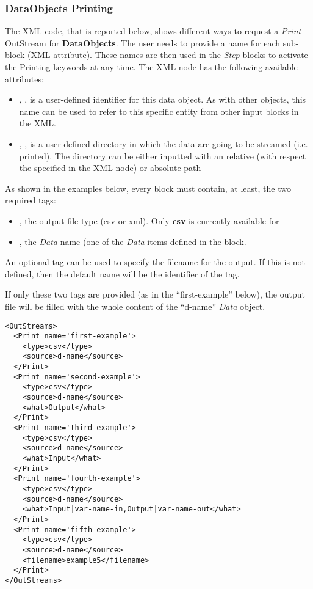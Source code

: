 \subsubsection{\textbf{DataObjects} Printing}
The XML code, that is reported below, shows different ways to request a
\textit{Print} OutStream for \textbf{DataObjects}.
%
The user needs to provide a name for each sub-block (XML attribute).
%
These names are then used in the \textit{Step} blocks to activate the Printing
keywords at any time.
%
The XML node has the following
available attributes:
\begin{itemize}
  \itemsep0em
  \item {}, , is a user-defined
  identifier for this data object.
  \nb As with other objects, this name can be used to refer to this specific
  entity from other input blocks in the XML.
  \item {}, , is a user-defined
  directory in which the data are going to be streamed (i.e. printed). The
  directory can be either inputted with an relative (with respect the  specified
  in the    XML node)  or absolute path
 \end{itemize}
As shown in the examples below, every  block must contain, at
least, the two required tags:
\vspace{-5mm}
\begin{itemize}
  \itemsep0em
  \item {}, the output file type (csv or xml).
  \nb Only \textbf{csv} is currently available for 
  \item {}, the \textit{Data} name (one of the \textit{Data} items
  defined in the  block.
\end{itemize}
\vspace{-5mm}

An optional tag  can be used to specify the filename for the
output. If this is not defined, then the default name will be the 
identifier of the tag.

If only these two tags are provided (as in the ``first-example'' below), the
output file will be filled with the whole content of the ``d-name''
\textit{Data} object.
%
\begin{lstlisting}[style=XML]
<OutStreams>
  <Print name='first-example'>
    <type>csv</type>
    <source>d-name</source>
  </Print>
  <Print name='second-example'>
    <type>csv</type>
    <source>d-name</source>
    <what>Output</what>
  </Print>
  <Print name='third-example'>
    <type>csv</type>
    <source>d-name</source>
    <what>Input</what>
  </Print>
  <Print name='fourth-example'>
    <type>csv</type>
    <source>d-name</source>
    <what>Input|var-name-in,Output|var-name-out</what>
  </Print>
  <Print name='fifth-example'>
    <type>csv</type>
    <source>d-name</source>
    <filename>example5</filename>
  </Print>
</OutStreams>
\end{lstlisting}

